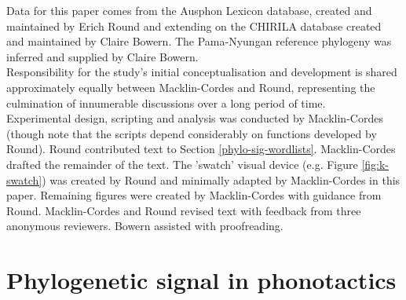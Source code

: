 \noindent
Data for this paper comes from the Ausphon Lexicon database, created and maintained by Erich Round and extending on the CHIRILA database created and maintained by Claire Bowern. The Pama-Nyungan reference phylogeny was inferred and supplied by Claire Bowern.\\

\noindent
Responsibility for the study's initial conceptualisation and development is shared approximately equally between Macklin-Cordes and Round, representing the culmination of innumerable discussions over a long period of time.\\

\noindent
Experimental design, scripting and analysis was conducted by Macklin-Cordes (though note that the scripts depend considerably on functions developed by Round). Round contributed text to Section \ref{phylo-sig-wordlists}. Macklin-Cordes drafted the remainder of the text. The 'swatch' visual device (e.g. Figure \ref{fig:k-swatch}) was created by Round and minimally adapted by Macklin-Cordes in this paper. Remaining figures were created by Macklin-Cordes with guidance from Round. Macklin-Cordes and Round revised text with feedback from three anonymous reviewers. Bowern assisted with proofreading.

\chapter[Phylogenetic signal in phonotactics]{Phylogenetic signal in phonotactics}
\label{ch-phylo-signal}	%
\pagestyle{headings}


